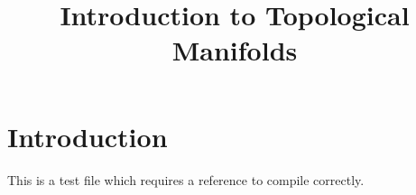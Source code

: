 


%


\title{Introduction to Topological Manifolds}


\maketitle

\label{section-phantom}

\tableofcontents

\section{Introduction}
\label{section-introduction}

This is a test file which requires a reference to compile correctly. \cite{Maclane}







